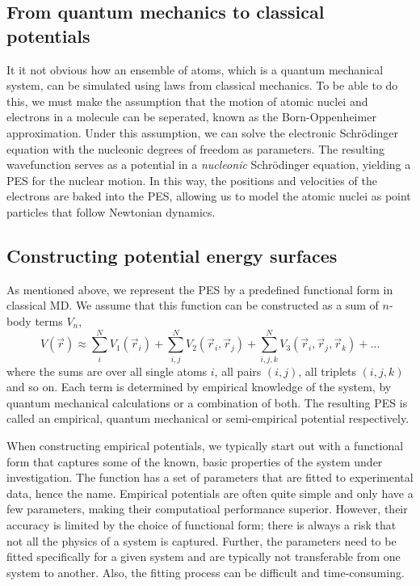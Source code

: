 \documentclass[twoside,english]{uiofysmaster}
\begin{document}
\subsection{From quantum mechanics to classical potentials} \label{sec:bornOppenheimer}
It it not obvious how an ensemble of atoms, which is a quantum mechanical system, can be simulated using 
laws from classical mechanics. To be able to do this,
we must make the assumption that the motion of atomic nuclei and electrons in a molecule
can be seperated, known as the Born-Oppenheimer approximation. 
Under this assumption, we can solve the electronic Schr\"{o}dinger equation with the nucleonic degrees of freedom as parameters.
The resulting wavefunction serves as a potential in a \textit{nucleonic} Schr\"{o}dinger equation, yielding a PES 
for the nuclear motion. In this way, the positions and velocities of the electrons are baked into the PES, 
allowing us to model the atomic nuclei as point particles that follow Newtonian dynamics. 


\subsection{Constructing potential energy surfaces} \label{sec:constructingPES}
As mentioned above, we represent the PES by a predefined functional form in classical MD. We assume that this
function can be constructed as a sum of $n$-body terms $V_n$,
\begin{equation}
 V(\vec{r}) \approx \sum_i^N V_1(\vec{r}_i) + \sum_{i,j}^N V_2(\vec{r}_i, \vec{r}_j) + 
 \sum_{i,j,k}^N V_3(\vec{r}_i, \vec{r}_j, \vec{r}_k) + \dots
 \label{generalPotential}
\end{equation}
where the sums are over all single atoms $i$, all pairs $(i,j)$, all triplets $(i,j,k)$ and so on. 
Each term is determined by empirical knowledge of the system, by quantum mechanical calculations or a combination of both. 
The resulting PES is called an empirical, quantum mechanical or semi-empirical potential respectively. 

When constructing empirical potentials, we typically start out with a functional form that captures some of the known, basic properties
of the system under investigation. The function has a set of parameters that are fitted to experimental data, hence the name.
Empirical potentials are often quite simple and only have a few parameters, making their computatioal performance superior. 
However, their
accuracy is limited by the choice of functional form; there is always a risk that not all the physics of a system
is captured. Further, the parameters need to be fitted specifically for a given system and are typically not transferable 
from one system to another. Also, the fitting process can be difficult and time-consuming. 
\end{document}
